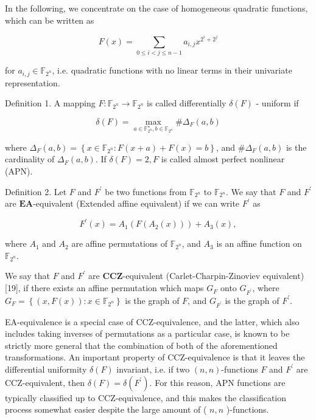 \documentclass[10pt]{article}
\begin{document}
In the following, we concentrate on the case of homogeneous quadratic functions, which can be written as

$$
F(x)=\sum_{0 \leq i<j \leq n-1} a_{i, j} x^{2^{i}+2^{j}}
$$

for $a_{i, j} \in \mathbb{F}_{2^{n}}$, i.e. quadratic functions with no linear terms in their univariate representation.

Definition 1. A mapping $F: \mathbb{F}_{2^{n}} \rightarrow \mathbb{F}_{2^{n}}$ is called differentially $\delta(F)$ - uniform if

$$
\delta(F)=\max _{a \in \mathbb{F}_{2^{n}}^{\star}, b \in \mathbb{F}_{2^{n}}} \# \Delta_{F}(a, b)
$$

where $\Delta_{F}(a, b)=\left\{x \in \mathbb{F}_{2^{n}}: F(x+a)+F(x)=b\right\}$, and $\# \Delta_{F}(a, b)$ is the cardinality of $\Delta_{F}(a, b)$. If $\delta(F)=2, F$ is called almost perfect nonlinear (APN).

Definition 2. Let $F$ and $F^{\prime}$ be two functions from $\mathbb{F}_{2^{n}}$ to $\mathbb{F}_{2^{n}}$. We say that $F$ and $F^{\prime}$ are $\boldsymbol{E} \boldsymbol{A}$-equivalent (Extended affine equivalent) if we can write $F^{\prime}$ as

$$
F^{\prime}(x)=A_{1}\left(F\left(A_{2}(x)\right)\right)+A_{3}(x),
$$

where $A_{1}$ and $A_{2}$ are affine permutations of $\mathbb{F}_{2^{n}}$, and $A_{3}$ is an affine function on $\mathbb{F}_{2^{n}}$.

We say that $F$ and $F^{\prime}$ are $\boldsymbol{C} \boldsymbol{C} \boldsymbol{Z}$-equivalent (Carlet-Charpin-Zinoviev equivalent) [19], if there exists an affine permutation which maps $G_{F}$ onto $G_{F^{\prime}}$, where $G_{F}=\left\{(x, F(x)): x \in \mathbb{F}_{2^{n}}\right\}$ is the graph of $F$, and $G_{F^{\prime}}$ is the graph of $F^{\prime}$.

EA-equivalence is a special case of CCZ-equivalence, and the latter, which also includes taking inverses of permutations as a particular case, is known to be strictly more general that the combination of both of the aforementioned transformations. An important property of CCZ-equivalence is that it leaves the differential uniformity $\delta(F)$ invariant, i.e. if two $(n, n)$-functions $F$ and $F^{\prime}$ are CCZ-equivalent, then $\delta(F)=\delta\left(F^{\prime}\right)$. For this reason, APN functions are typically classified up to CCZ-equivalence, and this makes the classification process somewhat easier despite the large amount of ( $n, n$ )-functions.
\end{document}
